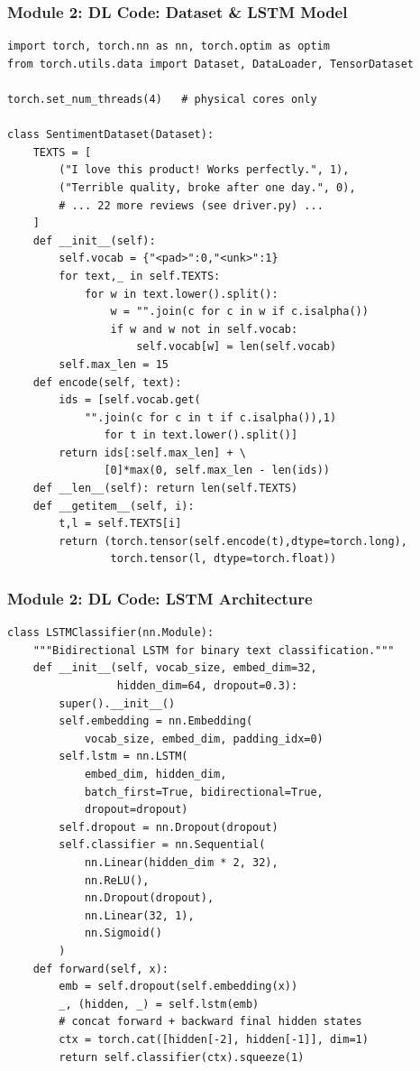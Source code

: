 \begin{frame}[fragile]\frametitle{Module 2: DL Code: Dataset \& LSTM Model}
\begin{lstlisting}
import torch, torch.nn as nn, torch.optim as optim
from torch.utils.data import Dataset, DataLoader, TensorDataset

torch.set_num_threads(4)   # physical cores only

class SentimentDataset(Dataset):
    TEXTS = [
        ("I love this product! Works perfectly.", 1),
        ("Terrible quality, broke after one day.", 0),
        # ... 22 more reviews (see driver.py) ...
    ]
    def __init__(self):
        self.vocab = {"<pad>":0,"<unk>":1}
        for text,_ in self.TEXTS:
            for w in text.lower().split():
                w = "".join(c for c in w if c.isalpha())
                if w and w not in self.vocab:
                    self.vocab[w] = len(self.vocab)
        self.max_len = 15
    def encode(self, text):
        ids = [self.vocab.get(
            "".join(c for c in t if c.isalpha()),1)
               for t in text.lower().split()]
        return ids[:self.max_len] + \
               [0]*max(0, self.max_len - len(ids))
    def __len__(self): return len(self.TEXTS)
    def __getitem__(self, i):
        t,l = self.TEXTS[i]
        return (torch.tensor(self.encode(t),dtype=torch.long),
                torch.tensor(l, dtype=torch.float))
\end{lstlisting}
\end{frame}

\begin{frame}[fragile]\frametitle{Module 2: DL Code: LSTM Architecture}
\begin{lstlisting}
class LSTMClassifier(nn.Module):
    """Bidirectional LSTM for binary text classification."""
    def __init__(self, vocab_size, embed_dim=32,
                 hidden_dim=64, dropout=0.3):
        super().__init__()
        self.embedding = nn.Embedding(
            vocab_size, embed_dim, padding_idx=0)
        self.lstm = nn.LSTM(
            embed_dim, hidden_dim,
            batch_first=True, bidirectional=True,
            dropout=dropout)
        self.dropout = nn.Dropout(dropout)
        self.classifier = nn.Sequential(
            nn.Linear(hidden_dim * 2, 32),
            nn.ReLU(),
            nn.Dropout(dropout),
            nn.Linear(32, 1),
            nn.Sigmoid()
        )
    def forward(self, x):
        emb = self.dropout(self.embedding(x))
        _, (hidden, _) = self.lstm(emb)
        # concat forward + backward final hidden states
        ctx = torch.cat([hidden[-2], hidden[-1]], dim=1)
        return self.classifier(ctx).squeeze(1)
\end{lstlisting}
\end{frame}

